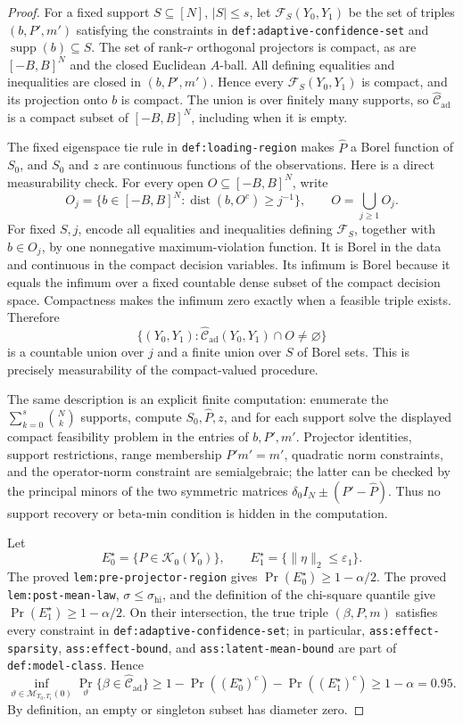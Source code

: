 \documentclass{article}
\begin{document}
\begin{proof}
For a fixed support \(S\subseteq[N]\), \(|S|\le s\), let \(\mathcal F_S(Y_0,Y_1)\) be the set of triples \((b,P',m')\) satisfying the constraints in \texttt{def:adaptive-confidence-set} and \(\operatorname{supp}(b)\subseteq S\).  The set of rank-\(r\) orthogonal projectors is compact, as are \([-B,B]^N\) and the closed Euclidean \(A\)-ball.  All defining equalities and inequalities are closed in \((b,P',m')\).  Hence every \(\mathcal F_S(Y_0,Y_1)\) is compact, and its projection onto \(b\) is compact.  The union is over finitely many supports, so \(\widehat{\mathcal C}_{\mathrm{ad}}\) is a compact subset of \([-B,B]^N\), including when it is empty.

The fixed eigenspace tie rule in \texttt{def:loading-region} makes \(\widehat P\) a Borel function of \(S_0\), and \(S_0\) and \(z\) are continuous functions of the observations.  Here is a direct measurability check.  For every open \(O\subseteq[-B,B]^N\), write
\[
 O_j=\{b\in[-B,B]^N:\operatorname{dist}(b,O^c)\ge j^{-1}\},
 \qquad O=\bigcup_{j\ge1}O_j.
\]
For fixed \(S,j\), encode all equalities and inequalities defining \(\mathcal F_S\), together with \(b\in O_j\), by one nonnegative maximum-violation function.  It is Borel in the data and continuous in the compact decision variables.  Its infimum is Borel because it equals the infimum over a fixed countable dense subset of the compact decision space.  Compactness makes the infimum zero exactly when a feasible triple exists.  Therefore
\[
 \{(Y_0,Y_1):\widehat{\mathcal C}_{\mathrm{ad}}(Y_0,Y_1)\cap O\ne\varnothing\}
\]
is a countable union over \(j\) and a finite union over \(S\) of Borel sets.  This is precisely measurability of the compact-valued procedure.

The same description is an explicit finite computation: enumerate the \(\sum_{k=0}^s{N\choose k}\) supports, compute \(S_0,\widehat P,z\), and for each support solve the displayed compact feasibility problem in the entries of \(b,P',m'\).  Projector identities, support restrictions, range membership \(P'm'=m'\), quadratic norm constraints, and the operator-norm constraint are semialgebraic; the latter can be checked by the principal minors of the two symmetric matrices \(\delta_0I_N\pm(P'-\widehat P)\).  Thus no support recovery or beta-min condition is hidden in the computation.

Let
\[
 E_0^\star=\{P\in\mathcal K_0(Y_0)\},
 \qquad
 E_1^\star=\{\lVert\eta\rVert_2\le\varepsilon_1\}.
\]
The proved \texttt{lem:pre-projector-region} gives \(\Pr(E_0^\star)\ge1-\alpha/2\).  The proved \texttt{lem:post-mean-law}, \(\sigma\le\sigma_{\mathrm{hi}}\), and the definition of the chi-square quantile give \(\Pr(E_1^\star)\ge1-\alpha/2\).  On their intersection, the true triple \((\beta,P,m)\) satisfies every constraint in \texttt{def:adaptive-confidence-set}; in particular, \texttt{ass:effect-sparsity}, \texttt{ass:effect-bound}, and \texttt{ass:latent-mean-bound} are part of \texttt{def:model-class}.  Hence
\[
 \inf_{\vartheta\in\mathcal M_{T_0,T_1}(0)}
 \Pr_\vartheta\{\beta\in\widehat{\mathcal C}_{\mathrm{ad}}\}
 \ge1-\Pr((E_0^\star)^c)-\Pr((E_1^\star)^c)
 \ge1-\alpha=0.95.
\]
By definition, an empty or singleton subset has diameter zero.


\end{proof}
\end{document}
